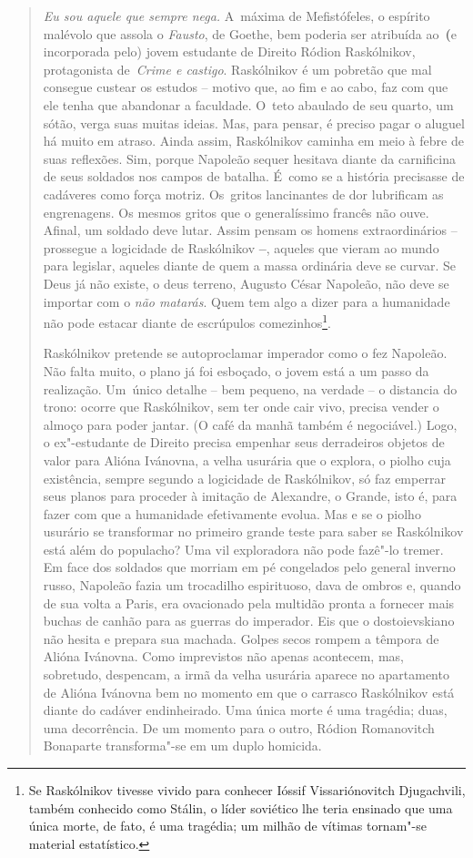 {\begin{quote}
\emph{Eu sou aquele que sempre nega.} A~máxima de Mefistófeles, o
espírito malévolo que assola o \emph{Fausto}, de Goethe, bem poderia ser
atribuída ao~\textbf{(}e incorporada pelo) jovem estudante de Direito
Ródion Raskólnikov, protagonista de~\emph{Crime e castigo}. Raskólnikov
é um pobretão que mal consegue custear os estudos -- motivo que, ao fim
e ao cabo, faz com que ele tenha que abandonar a faculdade. O~teto
abaulado de seu quarto, um sótão, verga suas muitas ideias. Mas, para
pensar, é preciso pagar o aluguel há muito em atraso. Ainda assim,
Raskólnikov caminha em meio à febre de suas reflexões. Sim, porque
Napoleão sequer hesitava diante da carnificina de seus soldados nos
campos de batalha. É~como se a história precisasse de cadáveres como
força motriz. Os~gritos lancinantes de dor lubrificam as engrenagens. Os
mesmos gritos que o generalíssimo francês não ouve. Afinal, um soldado
deve lutar. Assim pensam os homens extraordinários -- prossegue a
logicidade de Raskólnikov \textbf{--}, aqueles que vieram ao mundo para
legislar, aqueles diante de quem a massa ordinária deve se curvar. Se
Deus já não existe, o deus terreno, Augusto César Napoleão, não deve se
importar com o \emph{não matarás}. Quem tem algo a dizer para a
humanidade não pode estacar diante de escrúpulos comezinhos\footnote{Se
  Raskólnikov tivesse vivido para conhecer Ióssif Vissariónovitch
  Djugachvili, também conhecido como Stálin, o líder soviético lhe teria
  ensinado que uma única morte, de fato, é uma tragédia; um milhão de
  vítimas tornam"-se material estatístico.}.

Raskólnikov pretende se autoproclamar imperador como o fez Napoleão. Não
falta muito, o plano já foi esboçado, o jovem está a um passo da
realização. Um~único detalhe -- bem pequeno, na verdade -- o distancia
do trono: ocorre que Raskólnikov, sem ter onde cair vivo, precisa vender
o almoço para poder jantar. (O café da manhã também é negociável.) Logo,
o ex"-estudante de Direito precisa empenhar seus derradeiros objetos de
valor para Alióna Ivánovna, a velha usurária que o explora, o piolho
cuja existência, sempre segundo a logicidade de Raskólnikov, só faz
emperrar seus planos para proceder à imitação de Alexandre, o Grande,
isto é, para fazer com que a humanidade efetivamente evolua. Mas e se o
piolho usurário se transformar no primeiro grande teste para saber se
Raskólnikov está além do populacho? Uma vil exploradora não pode fazê"-lo
tremer. Em face dos soldados que morriam em pé congelados pelo general
inverno russo, Napoleão fazia um trocadilho espirituoso, dava de ombros
e, quando de sua volta a Paris, era ovacionado pela multidão pronta a
fornecer mais buchas de canhão para as guerras do imperador. Eis que o
dostoievskiano não hesita e prepara sua machada. Golpes secos rompem a
têmpora de Alióna Ivánovna. Como imprevistos não apenas acontecem, mas,
sobretudo, despencam, a irmã da velha usurária aparece no apartamento de
Alióna Ivánovna bem no momento em que o carrasco Raskólnikov está diante
do cadáver endinheirado. Uma única morte é uma tragédia; duas, uma
decorrência. De um momento para o outro, Ródion Romanovitch Bonaparte
transforma"-se em um duplo homicida.


\end{quote}}

